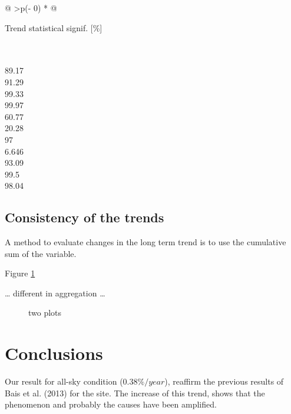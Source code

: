\documentclass[
  preprint, 3p, authoryear]{article}
\begin{document}
\begin{longtable}[]{@{}
  >{\centering\arraybackslash}p{(\columnwidth - 0\tabcolsep) * }@{}}
\toprule
\begin{minipage}[b]{\linewidth}\centering
Trend statistical signif. {[}\%{]}
\end{minipage} \\
\midrule
{} \\
89.17 \\
91.29 \\
99.33 \\
99.97 \\
60.77 \\
20.28 \\
97 \\
6.646 \\
93.09 \\
99.5 \\
98.04 \\
\bottomrule
\end{longtable}

\hypertarget{consistency-of-the-trends}{%
\subsection{Consistency of the trends}\label{consistency-of-the-trends}}

A method to evaluate changes in the long term trend is to use the cumulative sum of the variable.

Figure \ref{fig:cumsum}

\ldots{} different in aggregation \ldots{}

\begin{figure}[h!]

{\centering {}

}

\caption{two plots}\label{fig:cumsum}
\end{figure}

\hypertarget{conclusions}{%
\section{Conclusions}\label{conclusions}}

Our result for all-sky condition (\(0.38\%/year\)), reaffirm the previous results of Bais et al. (2013) for the site.
The increase of this trend, shows that the phenomenon and probably the causes have been amplified.
\end{document}
